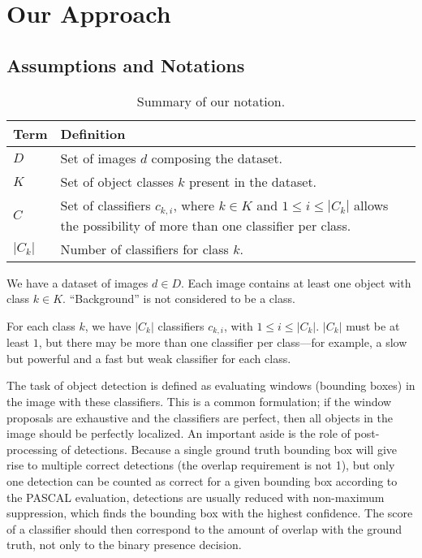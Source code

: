 \section{Our Approach}

\subsection{Assumptions and Notations}
\begin{table}
\centering
  \caption{Summary of our notation.}
  \begin{tabularx}{0.85\textwidth}
  {| l | X |}
  \hline
  Term &      Definition \\
  \hline
  $D$ &     Set of images $d$ composing the dataset. \\
  $K$ &     Set of object classes $k$ present in the dataset. \\
  $C$ &     Set of classifiers $c_{k,i}$, where $k \in K$ and $1 \leq i \leq |C_k|$ allows the possibility of more than one classifier per class. \\
  $|C_k|$ & Number of classifiers for class $k$. \\
  \hline
  \end{tabularx}
\label{tab:notation}
\end{table}

We have a dataset of images $d \in D$.
Each image contains at least one object with class $k \in K$.
``Background'' is not considered to be a class.

For each class $k$, we have $|C_k|$ classifiers $c_{k,i}$, with $1 \leq i \leq |C_k|$.
$|C_k|$ must be at least $1$, but there may be more than one classifier per class---for example, a slow but powerful and a fast but weak classifier for each class.

The task of object detection is defined as evaluating windows (bounding boxes) in the image with these classifiers.
This is a common formulation; if the window proposals are exhaustive and the classifiers are perfect, then all objects in the image should be perfectly localized.
An important aside is the role of post-processing of detections.
Because a single ground truth bounding box will give rise to multiple correct detections (the overlap requirement is not 1), but only one detection can be counted as correct for a given bounding box according to the PASCAL evaluation, detections are usually reduced with non-maximum suppression, which finds the bounding box with the highest confidence.
The score of a classifier should then correspond to the amount of overlap with the ground truth, not only to the binary presence decision.

